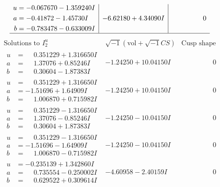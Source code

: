 \documentclass[1p]{elsarticle_modified}
\theoremstyle{definition}
\newcommand{\I}{\sqrt{-1}}
\begin{document}
$$\begin{array}{c|c|c}
\begin{aligned}
u &= -0.067670 - 1.359240 I \\
a &= -0.41872 - 1.45730 I \\
b &= -0.783478 - 0.633009 I\end{aligned}
 & -6.62180 + 4.34090 I & \phantom{-0.000000 } 0\\
 \hline 
 \end{array}$$\newpage$$\begin{array}{c|c|c}  
\text{Solutions to }I^u_{2}& \I (\text{vol} + \sqrt{-1}CS) & \text{Cusp shape}\\
 \hline 
\begin{aligned}
u &= \phantom{-}0.351229 + 1.316650 I \\
a &= \phantom{-}1.37076 + 0.85246 I \\
b &= \phantom{-}0.30604 - 1.87383 I\end{aligned}
 & -1.24250 + 10.04150 I & \phantom{-0.000000 } 0 \\ \hline\begin{aligned}
u &= \phantom{-}0.351229 + 1.316650 I \\
a &= -1.51696 + 1.64909 I \\
b &= \phantom{-}1.006870 + 0.715982 I\end{aligned}
 & -1.24250 + 10.04150 I & \phantom{-0.000000 } 0 \\ \hline\begin{aligned}
u &= \phantom{-}0.351229 - 1.316650 I \\
a &= \phantom{-}1.37076 - 0.85246 I \\
b &= \phantom{-}0.30604 + 1.87383 I\end{aligned}
 & -1.24250 - 10.04150 I & \phantom{-0.000000 } 0 \\ \hline\begin{aligned}
u &= \phantom{-}0.351229 - 1.316650 I \\
a &= -1.51696 - 1.64909 I \\
b &= \phantom{-}1.006870 - 0.715982 I\end{aligned}
 & -1.24250 - 10.04150 I & \phantom{-0.000000 } 0 \\ \hline\begin{aligned}
u &= -0.235139 + 1.342860 I \\
a &= \phantom{-}0.735554 - 0.250002 I \\
b &= \phantom{-}0.629522 + 0.309614 I\end{aligned}
 & -4.60958 - 2.40159 I & \phantom{-0.000000 } 0 \\ \hline\begin{aligned}

\end{aligned}
\end{array}$$
\end{document}
